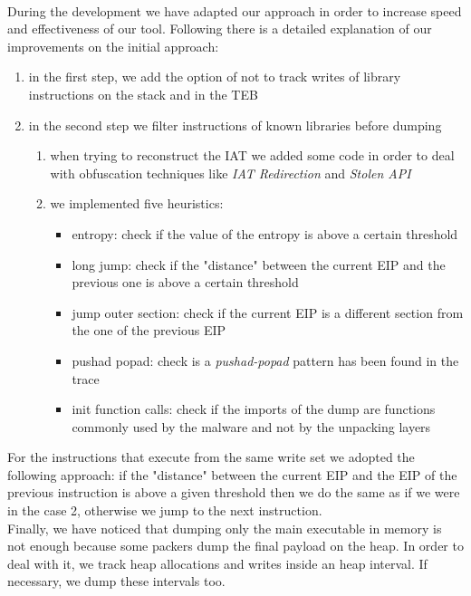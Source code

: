 \paragraph{}
During the development we have adapted our approach in order to increase speed and effectiveness of our tool. Following there is a detailed explanation of our improvements on the initial approach:
\begin{enumerate}
\item in the first step, we add the option of not to track writes of library instructions on the stack and in the \ac{TEB}
\item in the second step we filter instructions of known libraries before dumping
	\begin{enumerate}
	\item when trying to reconstruct the \ac{IAT} we added some code in order to deal with 			obfuscation techniques like \textit{\ac{IAT} Redirection} and \textit{Stolen \ac{API}}
	\item we implemented five heuristics:
		\begin{itemize}
		\item entropy: check if the value of the entropy is above a certain threshold
		\item long jump: check if the "distance" between the current EIP and the previous 			one is above a certain threshold
		\item jump outer section: check if the current EIP is a different section from the 		one of the previous EIP
		\item pushad popad: check is a \textit{pushad-popad} pattern has been found in the trace
		\item init function calls: check if the imports of the dump are functions commonly 			 used by the malware and not by the unpacking layers
		\end{itemize}
	\end{enumerate}
\end{enumerate} 
For the instructions that execute from the same write set we adopted the following approach: if the "distance" between the current EIP and the EIP of the previous instruction is above a given threshold then we do the same as if we were in the case 2, otherwise we jump to the next instruction.\\
Finally, we have noticed that dumping only the main executable in memory is not enough because some packers dump the final payload on the heap. In order to deal with it, we track heap allocations and writes inside an heap interval. If necessary, we dump these intervals too.

